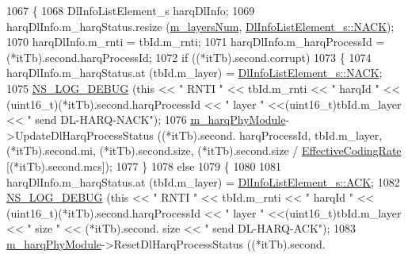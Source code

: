 \begin{DoxyCode}
1067                           \{
1068                             DlInfoListElement\_s harqDlInfo;
1069                             harqDlInfo.m\_harqStatus.resize (\hyperlink{classns3_1_1LteSpectrumPhy_ab1d0926cae5c6dd4a2c80653cef439bc}{m\_layersNum}, 
      \hyperlink{structns3_1_1DlInfoListElement__s_a3e55b89f756b7bd8909c8116a202a17aaf90e76e67c86729b4ee21927b7fb1770}{DlInfoListElement\_s::NACK});
1070                             harqDlInfo.m\_rnti = tbId.m\_rnti;
1071                             harqDlInfo.m\_harqProcessId = (*itTb).second.harqProcessId;
1072                             \textcolor{keywordflow}{if} ((*itTb).second.corrupt)
1073                               \{
1074                                 harqDlInfo.m\_harqStatus.at (tbId.m\_layer) = 
      \hyperlink{structns3_1_1DlInfoListElement__s_a3e55b89f756b7bd8909c8116a202a17aaf90e76e67c86729b4ee21927b7fb1770}{DlInfoListElement\_s::NACK};
1075                                 \hyperlink{group__logging_ga413f1886406d49f59a6a0a89b77b4d0a}{NS\_LOG\_DEBUG} (\textcolor{keyword}{this} << \textcolor{stringliteral}{" RNTI "} << tbId.m\_rnti << \textcolor{stringliteral}{" harqId "} << 
      (uint16\_t)(*itTb).second.harqProcessId << \textcolor{stringliteral}{" layer "} <<(uint16\_t)tbId.m\_layer << \textcolor{stringliteral}{" send DL-HARQ-NACK"});
1076                                 \hyperlink{classns3_1_1LteSpectrumPhy_a6febfefe8b9da4a5559c5bb08bf77f26}{m\_harqPhyModule}->UpdateDlHarqProcessStatus ((*itTb).second.
      harqProcessId, tbId.m\_layer, (*itTb).second.mi, (*itTb).second.size, (*itTb).second.size / 
      \hyperlink{namespacens3_af70af4887722b3badf3d57ca573d9502}{EffectiveCodingRate} [(*itTb).second.mcs]);
1077                               \}
1078                             \textcolor{keywordflow}{else}
1079                               \{
1080 
1081                                 harqDlInfo.m\_harqStatus.at (tbId.m\_layer) = 
      \hyperlink{structns3_1_1DlInfoListElement__s_a3e55b89f756b7bd8909c8116a202a17aad38ddc6546e38c8a4ca738262e0401a2}{DlInfoListElement\_s::ACK};
1082                                 \hyperlink{group__logging_ga413f1886406d49f59a6a0a89b77b4d0a}{NS\_LOG\_DEBUG} (\textcolor{keyword}{this} << \textcolor{stringliteral}{" RNTI "} << tbId.m\_rnti << \textcolor{stringliteral}{" harqId "} << 
      (uint16\_t)(*itTb).second.harqProcessId << \textcolor{stringliteral}{" layer "} <<(uint16\_t)tbId.m\_layer << \textcolor{stringliteral}{" size "} << (*itTb).second.
      size << \textcolor{stringliteral}{" send DL-HARQ-ACK"});
1083                                 \hyperlink{classns3_1_1LteSpectrumPhy_a6febfefe8b9da4a5559c5bb08bf77f26}{m\_harqPhyModule}->ResetDlHarqProcessStatus ((*itTb).second.

\end{DoxyCode}
